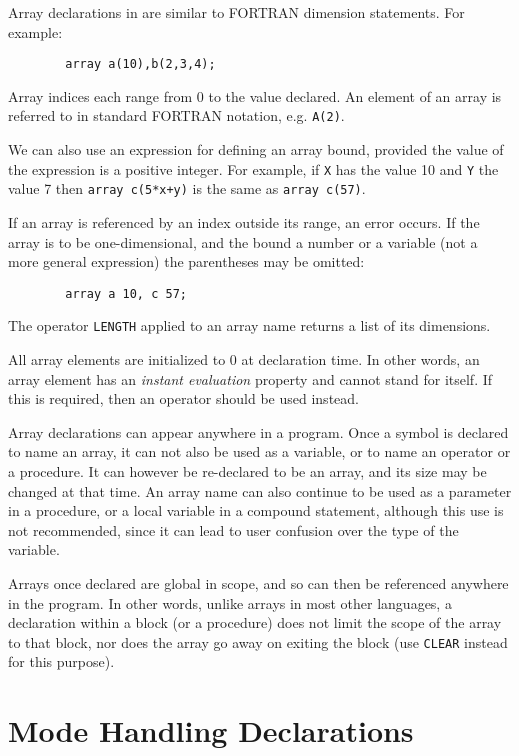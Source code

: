 Array declarations in {\REDUCE} are similar to FORTRAN
dimension statements.  For example:
\begin{verbatim}
        array a(10),b(2,3,4);
\end{verbatim}
Array indices each range from 0 to the value declared. An element of an
array is referred to in standard FORTRAN notation, e.g. {\tt A(2)}.

We can also use an expression for defining an array bound, provided the
value of the expression is a positive integer. For example, if {\tt X} has the
value 10 and {\tt Y} the value 7 then
{\tt array c(5*x+y)} is the same as {\tt array c(57)}.

If an array is referenced by an index outside its range, an error occurs.
If the array is to be one-dimensional, and the bound a number or a variable
(not a more general expression) the parentheses may be omitted:
\begin{verbatim}
        array a 10, c 57;
\end{verbatim}
The operator {\tt LENGTH} applied to an array name
returns a list of its dimensions.

All array elements are initialized to 0 at declaration time. In other words,
an array element has an {\em instant evaluation\/}
property and cannot stand for itself.  If this is required, then an
operator should be used instead.

Array declarations can appear anywhere in a program. Once a symbol is
declared to name an array, it can not also be used as a variable, or to
name an operator or a procedure. It can however be re-declared to be an
array, and its size may be changed at that time. An array name can also
continue to be used as a parameter in a procedure, or a local variable in
a compound statement, although this use is not recommended, since it can
lead to user confusion over the type of the variable.

Arrays once declared are global in scope, and so can then be referenced
anywhere in the program. In other words, unlike arrays in most other
languages, a declaration within a block (or a procedure) does not limit
the scope of the array to that block, nor does the array go away on
exiting the block (use {\tt CLEAR} instead for this purpose).

\section{Mode Handling Declarations}

